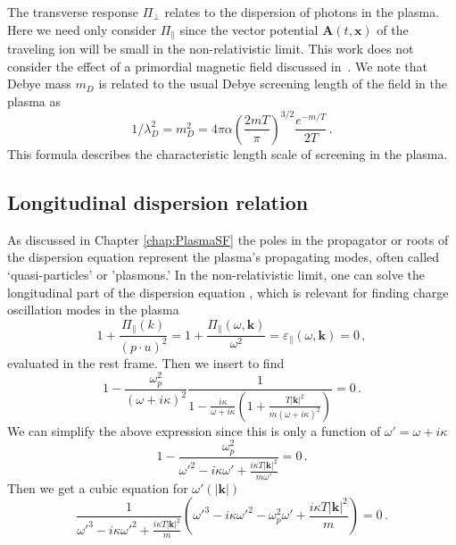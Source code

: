 The transverse response $\Pi_{\perp}$ relates to the dispersion of photons in the plasma. Here we need only consider $\Pi_\parallel$ since the vector potential $\boldsymbol{A}(t,\boldsymbol{x})$ of the traveling ion will be small in the non-relativistic limit. This work does not consider the effect of a primordial magnetic field discussed in~\citep{Steinmetz:2023abc}. We note that Debye mass $m_D$ is related to the usual Debye screening length of the field in the plasma as
\begin{equation}\label{eq:mL}
	1/\lambda_D^{2} = m_D^2= 4 \pi \alpha \left(\frac{2mT}{\pi}\right)^{3/2}\frac{e^{-m/T}}{2T}\,.
\end{equation}
This formula describes the characteristic length scale of screening in the plasma.

\subsection{Longitudinal dispersion relation}
As discussed in Chapter \ref{chap:PlasmaSF} the poles in the propagator or roots of the dispersion equation represent the plasma's propagating modes, often called `quasi-particles' or 'plasmons.' In the non-relativistic limit, one can solve the longitudinal part of the dispersion equation , which is relevant for finding charge oscillation modes in the plasma
\begin{equation}
    1+ \frac{\Pi_\parallel( k)}{(p\cdot u)^2}= 1+ \frac{\Pi_\parallel(\omega, \boldsymbol{k})}{\omega^2}=\varepsilon_\parallel(\omega,\boldsymbol{k}) =0 \,,
\end{equation}
evaluated in the rest frame. Then we insert  to find
\begin{equation}
   1- \frac{\omega_p^2}{(\omega+ i \kappa)^2} \frac{1}{1-\frac{i\kappa}{\omega+ i \kappa}\left(1+\frac{T |\boldsymbol{k}|^2}{m(\omega+ i \kappa)^2} \right)}=0 \,.
\end{equation}
We can simplify the above expression since this is only a function of $\omega' =\omega+i\kappa$
\begin{equation}
   1- \frac{\omega_p^2}{\omega'^2-i\kappa\omega'+\frac{i\kappa T |\boldsymbol{k}|^2}{m \omega'} }=0 \,.
\end{equation}
Then we get a cubic equation for $\omega'(|\boldsymbol{k}|)$
\begin{equation}\label{eq:dispfact}
   \frac{1}{\omega'^3-i\kappa\omega'^2+\frac{i\kappa T |\boldsymbol{k}|^2}{m} }
    \left(\omega'^3-i\kappa\omega'^2 - \omega_p^2\omega'+\frac{i\kappa T |\boldsymbol{k}|^2}{m} \right)=0 \,.
\end{equation}
